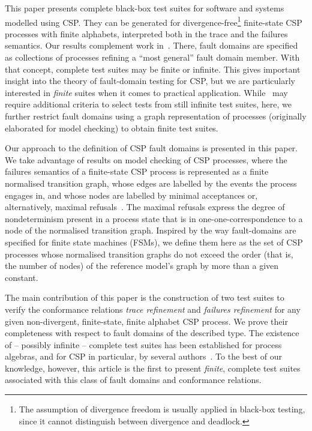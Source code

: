 This paper presents complete black-box test suites for software and systems
modelled using CSP. They can be generated for divergence-free\footnote{The
assumption of divergence freedom is usually applied in black-box testing,
since it cannot distinguish between divergence and deadlock.} finite-state
CSP processes with finite alphabets, interpreted both in the trace and the
failures semantics. Our results complement work
in~\cite{DBLP:conf/pts/CavalcantiS17}. There, fault domains are specified as
collections of processes refining a ``most general'' fault domain member.
With that concept, complete test suites may be finite or infinite. This gives
important insight into the theory of fault-domain testing for CSP, but we are
particularly interested in {\it finite} suites when it comes to practical
application. While~\cite{DBLP:conf/pts/CavalcantiS17} may require additional
criteria to select tests from still infinite test suites, here, we further
restrict fault domains using a graph representation of processes (originally
elaborated for model checking) to obtain finite test suites. 

Our approach to the definition of CSP fault domains is presented in this
paper. We take advantage of results on model checking of CSP
processes, where the failures semantics of a finite-state CSP process is
represented as a finite normalised transition graph, whose edges are labelled
by the events the process engages in, and whose nodes are labelled by minimal
acceptances or, alternatively, maximal
refusals~\cite{Roscoe:1994:chapter}. The maximal refusals express the
degree of nondeterminism present in a process state that is in
one-one-correspondence to a node of the normalised transition graph. Inspired
by the way fault-domains are specified for finite state machines (FSMs),
we define them here as the set of CSP processes whose normalised transition
graphs do not exceed the order (that is, the number of nodes) of the
reference model's graph by more than a given constant.

The main contribution of this paper is the construction of two test suites to
verify the conformance relations \emph{trace refinement} and \emph{failures
refinement} for any given non-divergent, finite-state, finite alphabet CSP
process. We prove their completeness with respect to fault domains
of the described type.  The existence of -- possibly infinite -- complete
test suites has been established for process algebras, and for CSP in
particular, by several
authors~\cite{Hennessy:1988:ATP:50497,Schneider:1995:OST:203471.203475,DBLP:conf/fm/PeleskaS96,peleska1997a,DBLP:conf/icfem/CavalcantiG07,DBLP:conf/pts/CavalcantiS17}.
To the best of our knowledge, however, this article is the first to present
{\it finite}, complete test suites associated with this class of fault
domains and conformance relations.

